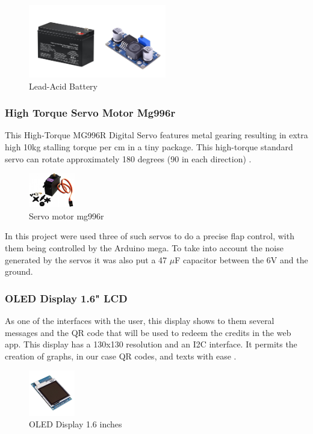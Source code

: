 \documentclass[a4paper,11pt]{article}
\begin{document}
\begin{figure}[H]
  \centering
  \includegraphics[width=6cm]{Figures/Battery-Regulator.png}
  \caption{\small{Lead-Acid Battery}}
  \label{fig:Battery}
\end{figure}

\subsubsection{High Torque Servo Motor Mg996r}
\label{subsubsec:servomotor}
This High-Torque MG996R Digital Servo features metal gearing resulting in extra high 10kg stalling torque per cm in a tiny package. This high-torque standard servo can rotate approximately 180 degrees (90 in each direction) \cite{servo}.

\begin{figure}[H]
  \centering
  \includegraphics[width=2cm]{Figures/servo-motor-mg996r-tower-pro-360-11kgcm-rotacao-continua-com-engrenagens-metalicas.jpg}
  \caption{\small{Servo motor mg996r}}
  \label{fig:servo}
\end{figure}

In this project were used three of such servos to do a precise flap control, with them being controlled by the Arduino mega. To take into account the noise generated by the servos it was also put a 47 $\mu$F capacitor between the 6V and the ground.

\subsubsection{OLED Display 1.6" \space LCD}
\label{subsubsec:oleddisplay}
As one of the interfaces with the user, this display shows to them several messages and the QR code that will be used to redeem the credits in the web app. This display has a 130x130 resolution and an I2C interface. It permits the creation of graphs, in our case QR codes, and texts with ease \cite{oleddisplay}.

\begin{figure}[H]
  \centering
  \includegraphics[width=2cm]{Figures/Display-LCD-TFT-1.6-130x130-Transflectivo-6-600x600.jpg}
  \caption{\small{OLED Display 1.6 inches}}
  \label{fig:display}
\end{figure}
\end{document}
